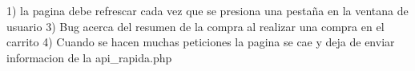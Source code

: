 




1) la pagina debe refrescar cada vez que se presiona una pestaña en la ventana de usuario
3) Bug acerca del resumen de la compra al realizar una compra en el carrito 
4) Cuando se hacen muchas peticiones la pagina se cae y deja de enviar informacion de la api_rapida.php







